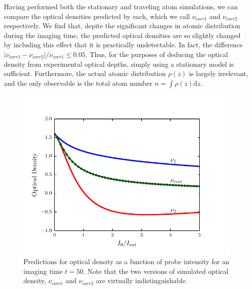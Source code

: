 \documentclass[12pt]{iopart}
\begin{document}
\par Having performed both the stationary and traveling atom simulations, we can compare the optical densities predicted by each, which we call $\nu_{corr1}$ and $\nu_{corr2}$ respectively. We find that, depite the significant changes in atomic distribution during the imaging time, the predicted optical densities are so slightly changed by including this effect that it is practically undetectable. In fact, the difference $\left|\nu_{corr1}-\nu_{corr2}\right|/\nu_{corr1} \le 0.05$. Thus, for the purposes of deducing the optical density from experimental optical depths, simply using a stationary model is sufficient. Furthermore, the actual atomic distribution $\rho(z)$ is largely irrelevant, and the only observable is the total atom number $n=\int\rho(z)\mathrm{d}z$. 
\begin{figure}
	\includegraphics{figure7.pdf}
\caption{Predictions for optical density as a function of probe intensity for an imaging time $t=50$\us. Note that the two versions of simulated optical density, $\nu_{corr1}$ and $\nu_{corr2}$ are virtually indistinguishable. }  
\label{fig:atomTravel}
\end{figure}
\end{document}
